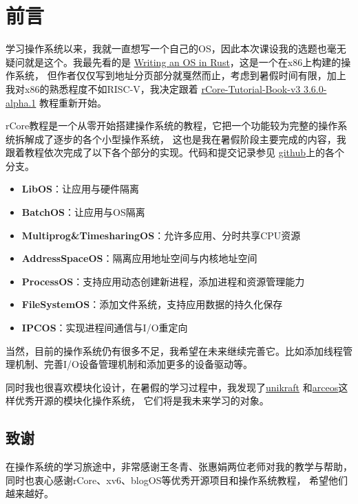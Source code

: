 \chapter*{前言}

学习操作系统以来，我就一直想写一个自己的OS，因此本次课设我的选题也毫无疑问就是这个。我最先看的是
\href{https://os.phil-opp.com/}{Writing an OS in Rust}，这是一个在x86上构建的操作系统，
但作者仅仅写到地址分页部分就戛然而止，考虑到暑假时间有限，加上我对x86的熟悉程度不如RISC-V，我决定跟着
\href{https://rcore-os.cn/rCore-Tutorial-Book-v3/index.html}{rCore-Tutorial-Book-v3 3.6.0-alpha.1}
教程重新开始。

rCore教程是一个从零开始搭建操作系统的教程，它把一个功能较为完整的操作系统拆解成了逐步的各个小型操作系统，
这也是我在暑假阶段主要完成的内容，我跟着教程依次完成了以下各个部分的实现。代码和提交记录参见
\href{https://github.com/Tinuvile/NimlothOS}{github}上的各个分支。

\begin{itemize}
    \item \textbf{LibOS}：让应用与硬件隔离
    \item \textbf{BatchOS}：让应用与OS隔离
    \item \textbf{Multiprog\&TimesharingOS}：允许多应用、分时共享CPU资源
    \item \textbf{AddressSpaceOS}：隔离应用地址空间与内核地址空间
    \item \textbf{ProcessOS}：支持应用动态创建新进程，添加进程和资源管理能力
    \item \textbf{FileSystemOS}：添加文件系统，支持应用数据的持久化保存
    \item \textbf{IPCOS}：实现进程间通信与I/O重定向
\end{itemize}

当然，目前的操作系统仍有很多不足，我希望在未来继续完善它。比如添加线程管理机制、完善I/O设备管理机制和添加更多的设备驱动等。

同时我也很喜欢模块化设计，在暑假的学习过程中，我发现了\href{https://github.com/unikraft/unikraft}{unikraft}
和\href{https://github.com/arceos-org/arceos}{arceos}这样优秀开源的模块化操作系统，
它们将是我未来学习的对象。

\section*{致谢}

在操作系统的学习旅途中，非常感谢王冬青、张惠娟两位老师对我的教学与帮助，同时也衷心感谢rCore、xv6、blogOS等优秀开源项目和操作系统教程，
希望他们越来越好。